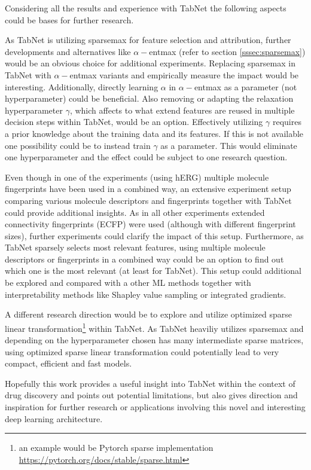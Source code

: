 \documentclass[../main.tex]{subfiles}
\begin{document}
Considering all the results and experience with TabNet the following aspects could be bases for further research. 

As TabNet is utilizing sparsemax for feature selection and attribution, further developments and alternatives like $\alpha-$entmax (refer to section \ref{sssec:sparsemax}) would be an obvious choice for additional experiments. Replacing sparsemax in TabNet with $\alpha-$entmax variants and empirically measure the impact would be interesting. Additionally, directly learning $\alpha$ in $\alpha-$entmax as a parameter (not hyperparameter) could be beneficial. 
Also removing or adapting the relaxation hyperparameter $\gamma$, which affects to what extend features are reused in multiple decision steps within TabNet, would be an option. Effectively utilizing $\gamma$ requires a prior knowledge about the training data and its features. If this is not available one possibility could be to instead train $\gamma$ as a parameter. This would eliminate one hyperparameter and the effect could be subject to one research question.
\newline

Even though in one of the experiments (using hERG) multiple molecule fingerprints have been used in a combined way, an extensive experiment setup comparing various molecule descriptors and fingerprints together with TabNet could provide additional insights. As in all other experiments extended connectivity fingerprints (ECFP) were used (although with different fingerprint sizes), further experiments could clarify the impact of this setup. 
Furthermore, as TabNet sparsely selects most relevant features, using multiple molecule descriptors or fingerprints in a combined way could be an option to find out which one is the most relevant (at least for TabNet). This setup could additional be explored and compared with a other ML methods together with interpretability methods like Shapley value sampling or integrated gradients. 
\newline

A different research direction would be to explore and utilize optimized sparse linear transformation\footnote{an example would be Pytorch sparse implementation \url{https://pytorch.org/docs/stable/sparse.html}} within TabNet. As TabNet heaviliy utilizes sparsemax and depending on the hyperparameter chosen has many intermediate sparse matrices, using optimized sparse linear transformation could potentially lead to very compact, efficient and fast models.
\newline

Hopefully this work provides a useful insight into TabNet within the context of drug discovery and points out potential limitations, but also gives direction and inspiration for further research or applications involving this novel and interesting deep learning architecture.
\end{document}
